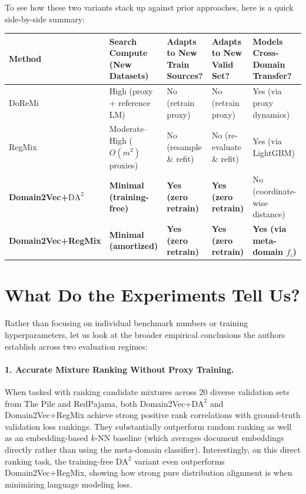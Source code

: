 \documentclass[12pt]{article}
\begin{document}
To see how these two variants stack up against prior approaches, here is a quick side-by-side summary:

\begin{center}
\small
\begin{tabular}{@{}l p{2.7cm} p{2.7cm} p{2.7cm} p{2.7cm}@{}}
\toprule
\textbf{Method} & \textbf{Search Compute (New Datasets)} & \textbf{Adapts to New Train Sources?} & \textbf{Adapts to New Valid Set?} & \textbf{Models Cross-Domain Transfer?} \\
\midrule
DoReMi~\cite{xie2023doremi} & High (proxy + reference LM) & No (retrain proxy) & No (retrain proxy) & Yes (via proxy dynamics) \\
RegMix~\cite{liu2024regmix} & Moderate--High ($O(m^2)$ proxies) & No (resample \& refit) & No (re-evaluate \& refit) & Yes (via LightGBM) \\
\textbf{Domain2Vec+$\mathrm{DA}^2$} & \textbf{Minimal (training-free)} & \textbf{Yes (zero retrain)} & \textbf{Yes (zero retrain)} & No (coordinate-wise distance) \\
\textbf{Domain2Vec+RegMix} & \textbf{Minimal (amortized)} & \textbf{Yes (zero retrain)} & \textbf{Yes (zero retrain)} & \textbf{Yes (via meta-domain $f_i$)} \\
\bottomrule
\end{tabular}
\end{center}

\section*{What Do the Experiments Tell Us?}

Rather than focusing on individual benchmark numbers or training hyperparameters, let us look at the broader empirical conclusions the authors establish across two evaluation regimes:

\paragraph{1. Accurate Mixture Ranking Without Proxy Training.}
When tasked with ranking candidate mixtures across 20 diverse validation sets from The Pile and RedPajama, both Domain2Vec+$\mathrm{DA}^2$ and Domain2Vec+RegMix achieve strong positive rank correlations with ground-truth validation loss rankings. They substantially outperform random ranking as well as an embedding-based $k$-NN baseline (which averages document embeddings directly rather than using the meta-domain classifier). Interestingly, on this direct ranking task, the training-free $\mathrm{DA}^2$ variant even outperforms Domain2Vec+RegMix, showing how strong pure distribution alignment is when minimizing language modeling loss.
\end{document}
